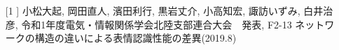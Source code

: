 \section*{}
\begin{enumerate}
\item[[1]]
小松大起, 岡田直人, 濱田利行, 黒岩丈介, 小高知宏, 諏訪いずみ, 白井治彦,
令和1年度電気・情報関係学会北陸支部連合大会　発表,
F2-13 ネットワークの構造の違いによる表情認識性能の差異(2019.8)
\end{enumerate}
